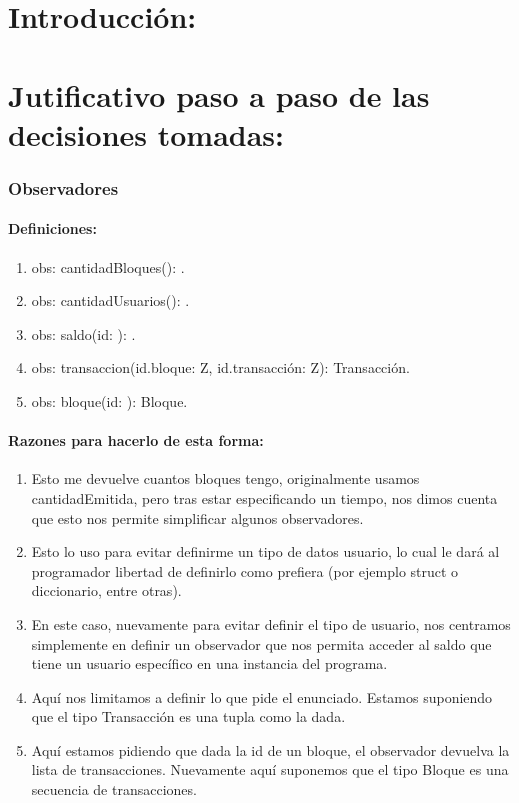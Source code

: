 \documentclass[10pt,a4paper]{article}
\begin{document}
\maketitle

\part{Introducción: }

\part{Jutificativo paso a paso de las decisiones tomadas:}


\section{Observadores}

\subsection{Definiciones:}
\begin{enumerate}
    \item obs: cantidadBloques(): \ent.
    \item obs: cantidadUsuarios(): \ent.
    \item obs: saldo(id: \ent): \ent.
    \item obs: transaccion(id.bloque: Z, id.transacción: Z): Transacción.
    \item obs: bloque(id: \ent): Bloque.
\end{enumerate}


\subsection{Razones para hacerlo de esta forma:}

\begin{enumerate}
    \item Esto me devuelve cuantos bloques tengo, originalmente usamos cantidadEmitida, pero tras estar especificando un tiempo, nos dimos cuenta que esto nos permite simplificar algunos observadores.
    \item Esto lo uso para evitar definirme un tipo de datos usuario, lo cual le dará al programador libertad de definirlo como prefiera (por ejemplo struct o diccionario, entre otras).
    \item En este caso, nuevamente para evitar definir el tipo de usuario, nos centramos simplemente en definir un observador que nos permita acceder al saldo que tiene un usuario específico en una instancia del programa.
    \item Aquí nos limitamos a definir lo que pide el enunciado. Estamos suponiendo que el tipo Transacción es una tupla como la dada.
    \item Aquí estamos pidiendo que dada la id de un bloque, el observador devuelva la lista de transacciones. Nuevamente aquí suponemos que el tipo Bloque es una secuencia de transacciones.
\end{enumerate}
\end{document}
